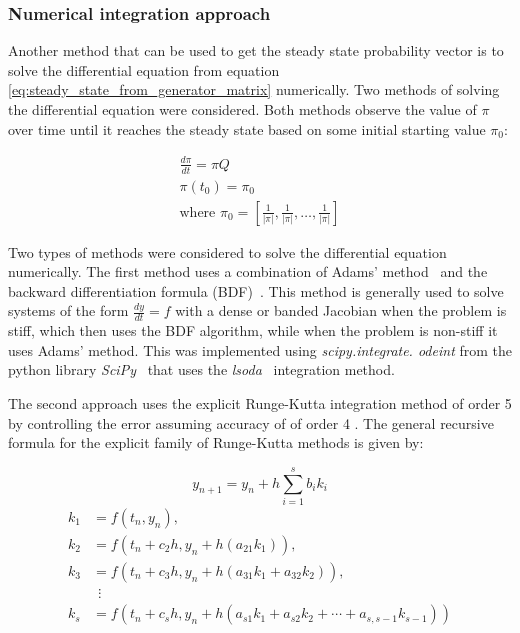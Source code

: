 \subsubsection{Numerical integration approach}

Another method that can be used to get the steady state probability vector is
to solve the differential equation from equation
\ref{eq:steady_state_from_generator_matrix} numerically.
Two methods of solving the differential equation were considered.
Both methods observe the value of \(\pi\) over time until it
reaches the steady state based on some initial starting value \(\pi_0\):

\begin{gather}
    \frac{d\pi}{dt} = \pi Q \\
    \pi(t_0) = \pi_0 \nonumber \\
    \text{where } \pi_0 = 
    [\frac{1}{|\pi|}, \frac{1}{|\pi|}, \dots, \frac{1}{|\pi|}] \nonumber
\end{gather}

Two types of methods were considered to solve the differential equation
numerically.
The first method uses a combination of Adams' method~\cite{adams_method} and the
backward differentiation formula (BDF)~\cite{backward_differentiation_formula}.
This method is generally used to solve systems of the form
\(\frac{dy}{dt} = f\) with a dense or banded Jacobian when the problem is stiff,
which then uses the BDF algorithm, while when the problem is non-stiff it uses
Adams' method.
This was implemented using \textit{scipy.integrate. odeint} from the python
library \textit{SciPy}~\cite{2020SciPy-NMeth} that uses the
\textit{lsoda}~\cite{lsoda_algorithm} integration method.

The second approach uses the explicit Runge-Kutta integration method of order 5
by controlling the error assuming accuracy of of order 4
\cite{solve_ivp_rk45_method, runge_kutta_formulas}.
The general recursive formula for the explicit family of Runge-Kutta methods is
given by:

\begin{equation}
    y_{n+1} = y_n + h \sum_{i=1}^s b_i k_i
\end{equation}
\begin{align}
    k_1 & = f(t_n, y_n), \nonumber \\
    k_2 & = f(t_n+c_2h, y_n+h(a_{21}k_1)), \nonumber \\
    k_3 & = f(t_n+c_3h, y_n+h(a_{31}k_1+a_{32}k_2)), \nonumber \\
        & \ \ \vdots \nonumber \\
    k_s & = f(t_n+c_s h, y_n+h(a_{s1}k_1+a_{s2}k_2+\cdots+a_{s,s-1}k_{s-1})) 
    \nonumber
\end{align}

